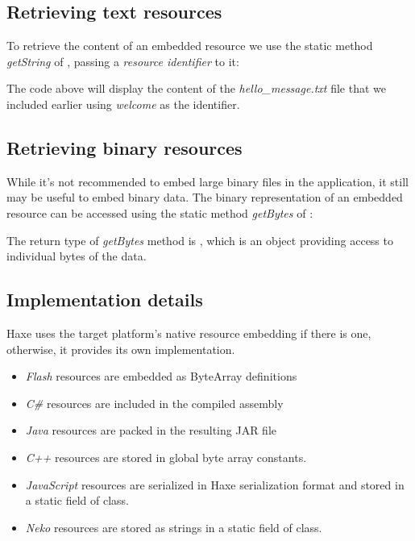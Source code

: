 \subsection{Retrieving text resources}
\label{cr-resources-getString}

To retrieve the content of an embedded resource we use the static method \emph{getString} of , passing a \emph{resource identifier} to it:


The code above will display the content of the \emph{hello_message.txt} file that we included earlier using \emph{welcome} as the identifier.

\subsection{Retrieving binary resources}
\label{cr-resources-getBytes}

While it's not recommended to embed large binary files in the application, it still may be useful to embed binary data. The binary representation of an embedded resource can be accessed using the static method \emph{getBytes} of :


The return type of \emph{getBytes} method is , which is an object providing access to individual bytes of the data.

\subsection{Implementation details}
\label{cr-resources-impl}

Haxe uses the target platform's native resource embedding if there is one, otherwise, it provides its own implementation.

\begin{itemize}
\item \emph{Flash} resources are embedded as ByteArray definitions
\item \emph{C\#} resources are included in the compiled assembly
\item \emph{Java} resources are packed in the resulting JAR file
\item \emph{C++} resources are stored in global byte array constants.
\item \emph{JavaScript} resources are serialized in Haxe serialization format and stored in a static field of  class.
\item \emph{Neko} resources are stored as strings in a static field of  class.
\end{itemize}




